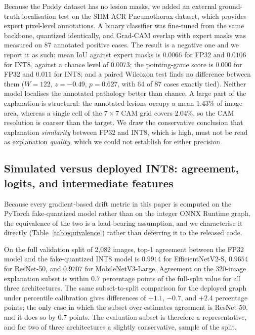 \documentclass[fleqn,10pt]{wlscirep}
\begin{document}
Because the Paddy dataset has no lesion masks, we added an external ground-truth localisation test on the SIIM-ACR Pneumothorax dataset, which provides expert pixel-level annotations. A binary classifier was fine-tuned from the same backbone, quantized identically, and Grad-CAM overlap with expert masks was measured on 87 annotated positive cases. The result is a negative one and we report it as such: mean IoU against expert masks is $0.0066$ for FP32 and $0.0106$ for INT8, against a chance level of $0.0073$; the pointing-game score is $0.000$ for FP32 and $0.011$ for INT8; and a paired Wilcoxon test finds no difference between them ($W = 122$, $z = -0.49$, $p = 0.627$, with 64 of 87 cases exactly tied). Neither model localises the annotated pathology better than chance. A large part of the explanation is structural: the annotated lesions occupy a mean $1.43\%$ of image area, whereas a single cell of the $7 \times 7$ CAM grid covers $2.04\%$, so the CAM resolution is coarser than the target. We draw the conservative conclusion that explanation \emph{similarity} between FP32 and INT8, which is high, must not be read as explanation \emph{quality}, which we could not establish for either precision.



\subsection*{Simulated versus deployed INT8: agreement, logits, and intermediate features}

Because every gradient-based drift metric in this paper is computed on the PyTorch fake-quantized model rather than on the integer ONNX Runtime graph, the equivalence of the two is a load-bearing assumption, and we characterise it directly (Table~\ref{tab:equivalence}) rather than deferring it to the released code.

On the full validation split of 2{,}082 images, top-1 agreement between the FP32 model and the fake-quantized INT8 model is $0.9914$ for EfficientNetV2-S, $0.9654$ for ResNet-50, and $0.9707$ for MobileNetV3-Large. Agreement on the 320-image explanation subset is within $0.7$ percentage points of the full-split value for all three architectures. The same subset-to-split comparison for the deployed graph under percentile calibration gives differences of $+1.1$, $-0.7$, and $+2.4$ percentage points; the only case in which the subset over-estimates agreement is ResNet-50, and it does so by $0.7$ points. The evaluation subset is therefore a representative, and for two of three architectures a slightly conservative, sample of the split.
\end{document}
